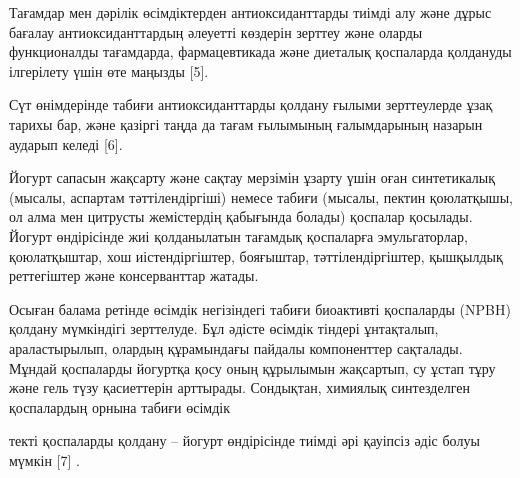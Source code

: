 \begin{multicols}{2}
Тағамдар мен дәрілік өсімдіктерден антиоксиданттарды тиімді алу және
дұрыс бағалау антиоксиданттардың әлеуетті көздерін зерттеу және оларды
функционалды тағамдарда, фармацевтикада және диеталық қоспаларда
қолдануды ілгерілету үшін өте маңызды {[}5{]}.

Сүт өнімдерінде табиғи антиоксиданттарды қолдану ғылыми зерттеулерде
ұзақ тарихы бар, және қазіргі таңда да тағам ғылымының ғалымдарының
назарын аударып келеді {[}6{]}.

Йогурт сапасын жақсарту және сақтау мерзімін ұзарту үшін оған
синтетикалық (мысалы, аспартам тәттілендіргіші) немесе табиғи (мысалы,
пектин қоюлатқышы, ол алма мен цитрусты жемістердің қабығында болады)
қоспалар қосылады. Йогурт өндірісінде жиі қолданылатын тағамдық
қоспаларға эмульгаторлар, қоюлатқыштар, хош иістендіргіштер, бояғыштар,
тәттілендіргіштер, қышқылдық реттегіштер және консерванттар жатады.

Осыған балама ретінде өсімдік негізіндегі табиғи биоактивті қоспаларды
(NPBH) қолдану мүмкіндігі зерттелуде. Бұл әдісте өсімдік тіндері
ұнтақталып, араластырылып, олардың құрамындағы пайдалы компоненттер
сақталады. Мұндай қоспаларды йогуртқа қосу оның құрылымын жақсартып, су
ұстап тұру және гель түзу қасиеттерін арттырады. Сондықтан, химиялық
синтезделген қоспалардың орнына табиғи өсімдік

текті қоспаларды қолдану -- йогурт өндірісінде тиімді әрі қауіпсіз әдіс
болуы мүмкін {[}7{]} .
\end{multicols}

